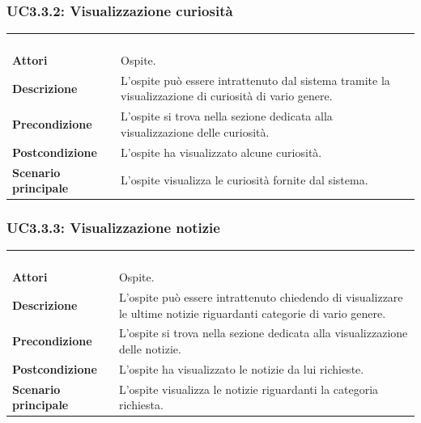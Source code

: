 \subsubsection{UC3.3.2: Visualizzazione curiosità}
\label{UC3.3.2}
\begin{longtable}{l|p{10cm}}
\rowcolor[gray]{0.8} \multicolumn{2}{c}{} \\
\rowcolor[gray]{0.8} \multicolumn{2}{c}{\textbf{UC3.3.2 - Visualizzazione curiosità}} \\
\rowcolor[gray]{0.8} \multicolumn{2}{c}{} \\
\hline
&\\
\textbf{Attori} & Ospite.\\[7pt]
\textbf{Descrizione} & L'ospite può essere intrattenuto dal sistema tramite la visualizzazione di curiosità di vario genere.\\[7pt]
\textbf{Precondizione} & L'ospite si trova nella sezione dedicata alla visualizzazione delle curiosità.\\[7pt]
\textbf{Postcondizione} & L'ospite ha visualizzato alcune curiosità.\\[7pt]
\textbf{Scenario principale} &L'ospite visualizza le curiosità fornite dal sistema.\\[7pt]\hline
\end{longtable}

\subsubsection{UC3.3.3: Visualizzazione notizie}
\label{UC3.3.3}
\begin{longtable}{l|p{10cm}}
\rowcolor[gray]{0.8} \multicolumn{2}{c}{} \\
\rowcolor[gray]{0.8} \multicolumn{2}{c}{\textbf{UC3.3.3 - Visualizzazione notizie}} \\
\rowcolor[gray]{0.8} \multicolumn{2}{c}{} \\
\hline
&\\
\textbf{Attori} & Ospite.\\[7pt]
\textbf{Descrizione} & L'ospite può essere intrattenuto chiedendo di visualizzare le ultime notizie riguardanti categorie di vario genere.\\[7pt]
\textbf{Precondizione} & L'ospite si trova nella sezione dedicata alla visualizzazione delle notizie.\\[7pt]
\textbf{Postcondizione} & L'ospite ha visualizzato le notizie da lui richieste.\\[7pt]
\textbf{Scenario principale} &L'ospite visualizza le notizie riguardanti la categoria richiesta.\\[7pt]\hline
\end{longtable}

